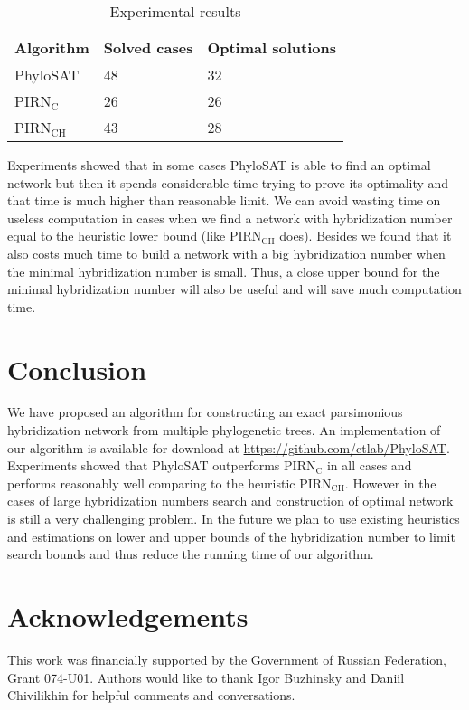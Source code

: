 \documentclass[runningheads, envcountsame, a4paper]{llncs}
\begin{document}
\begin{table}[t]
\centering
\caption{Experimental results}
\begin{tabular}{l | l | l}
  Algorithm & Solved cases & Optimal solutions \\
  
  \hline
  PhyloSAT & 48 & 32 \\
  PIRN$\mathrm{_C}$ & 26 & 26 \\
  PIRN$\mathrm{_{CH}}$ & 43 & 28 \\
  
\end{tabular}
\label{exp-results-table}
\end{table}

Experiments showed that in some cases PhyloSAT is able to find an optimal network but then it spends considerable time trying to prove its optimality 
and that time is much higher than reasonable limit. We can avoid wasting time on useless computation 
in cases when we find a network with hybridization number equal to the heuristic lower bound (like PIRN$\mathrm{_{CH}}$ does). Besides we found 
that it also costs much time to build a network with a big hybridization number when the minimal hybridization number is small. 
Thus, a close upper bound for the minimal hybridization number will also be useful and will save much computation time.

\section{Conclusion}

We have proposed an algorithm for constructing an exact parsimonious hybridization network from multiple phylogenetic trees.
An implementation of our algorithm is available for download at \url{https://github.com/ctlab/PhyloSAT}.
Experiments showed that PhyloSAT outperforms PIRN$\mathrm{_C}$ in all cases and performs reasonably well comparing 
to the heuristic PIRN$\mathrm{_{CH}}$. 
However in the cases of large hybridization numbers search and construction of optimal network is still a very challenging problem. 
In the future we plan to use existing heuristics and estimations on lower and upper bounds of the hybridization number to 
limit search bounds and thus reduce the running time of our algorithm.

\section*{Acknowledgements}

This work was financially supported by the Government of Russian Federation, Grant 074-U01. Authors would like to thank Igor Buzhinsky and Daniil Chivilikhin for helpful comments and conversations.



\clearpage
\end{document}
